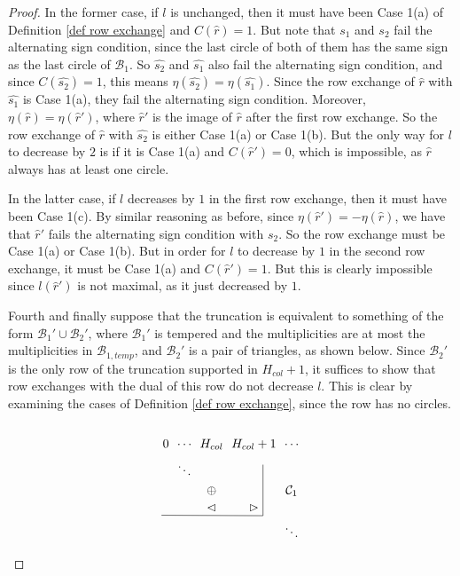 \documentclass[11pt,letterpaper]{amsart}
\newcommand{\BB}{\mathcal{B}}
\newcommand{\CC}{\mathcal{C}}
\numberwithin{equation}{section}
\begin{document}
\begin{proof}
    In the former case, if $l$ is unchanged, then it must have been Case 1(a) of Definition \ref{def row exchange} and $C(\widehat{r}) = 1$. But note that $s_1$ and $s_2$ fail the alternating sign condition, since the last circle of both of them has the same sign as the last circle of $\BB_1$. So $\widehat{s_2}$ and $\widehat{s_1}$ also fail the alternating sign condition, and since $C(\widehat{s_2})=1$, this means $\eta(\widehat{s_2}) = \eta(\widehat{s_1})$. Since the row exchange of $\widehat{r}$ with $\widehat{s_1}$ is Case 1(a), they fail the alternating sign condition. Moreover, $\eta(\widehat{r}) = \eta(\widehat{r}')$, where $\widehat{r}'$ is the image of $\widehat{r}$ after the first row exchange. So the row exchange of $\widehat{r}$ with $\widehat{s_2}$ is either Case 1(a) or Case 1(b). But the only way for $l$ to decrease by $2$ is if it is Case 1(a) and $C(\widehat{r}') = 0$, which is impossible, as $\widehat{r}$ always has at least one circle.

    In the latter case, if $l$ decreases by $1$ in the first row exchange, then it must have been Case 1(c). By similar reasoning as before, since $\eta(\widehat{r}') = -\eta(\widehat{r})$, we have that $\widehat{r}'$ fails the alternating sign condition with $\widehat{s_2}$. So the row exchange must be Case 1(a) or Case 1(b). But in order for $l$ to decrease by $1$ in the second row exchange, it must be Case 1(a) and $C(\widehat{r}') = 1$. But this is clearly impossible since $l(\widehat{r}')$ is not maximal, as it just decreased by $1$.

    Fourth and finally suppose that the truncation is equivalent to something of the form $\BB_1' \cup \BB_2'$, where $\BB_1'$ is tempered and the multiplicities are at most the multiplicities in $\BB_{1, temp}$, and $\BB_2'$ is a pair of triangles, as shown below. Since $\BB_2'$ is the only row of the truncation supported in $H_{col}+1$, it suffices to show that row exchanges with the dual of this row do not decrease $l$. This is clear by examining the cases of Definition \ref{def row exchange}, since the row has no circles.
    \[\begin{tikzpicture}[baseline=(current bounding box.north)]
      \matrix (m) [matrix of math nodes, nodes in empty cells] {
        0 & \cdots & H_{col} & H_{col} + 1 & \cdots\\
        & \ddots & \phantom{\oplus} & \phantom{\oplus} & \\
        & & \oplus & & \CC_1 \\
        & & \lhd & \rhd & \\
        & & & & \ddots \\
      } ;
      \draw (m-4-1.south west) -- (m-4-4.south east);
      \draw (m-4-4.south east) -- (m-2-4.north east);
    \end{tikzpicture}\]
    

\end{proof}
\end{document}
